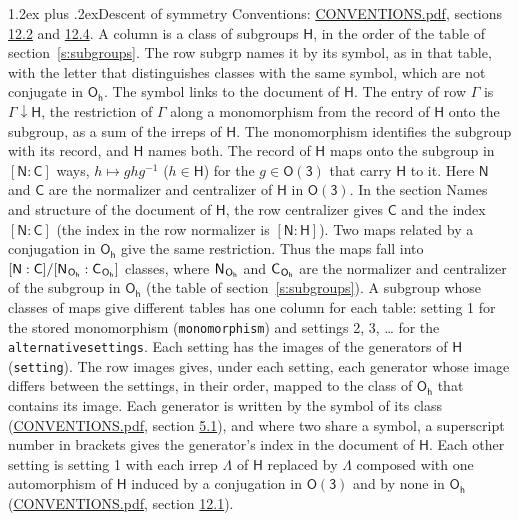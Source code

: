 \documentclass[10pt,a4paper]{article}
\makeatletter
\renewcommand\section{\@startsection{section}{1}{\z@}{-3ex plus -1ex minus -.2ex}%
  {1.2ex plus .2ex}{\normalfont\large\sffamily\bfseries\color{parttitle}}}
\numberwithin{equation}{section}
\newcommand{\grp}[1]{\mathsf{#1}}
\newcommand{\grpindex}[2]{[#1 : #2]}
\newcommand{\restr}[2]{#1\!\downarrow#2}
\newcommand{\hairsp}{\mkern1mu}
\makeatother
\begin{document}
\section{Descent of symmetry}\label{s:subduction}
Conventions: \href{../../CONVENTIONS.pdf}{CONVENTIONS.pdf}, sections \href{../../CONVENTIONS.pdf\#conv.12.2}{12.2} and \href{../../CONVENTIONS.pdf\#conv.12.4}{12.4}.
A column is a class of subgroups $\grp{H}$, in the order of the table of section~\ref{s:subgroups}. The row subgrp names it by its symbol, as in that table, with the letter that distinguishes classes with the same symbol, which are not conjugate in $\grp{O_{h}}$. The symbol links to the document of $\grp{H}$. The entry of row $\Gamma$ is $\restr{\Gamma}{\grp{H}}$, the restriction of $\Gamma$ along a monomorphism from the record of $\grp{H}$ onto the subgroup, as a sum of the irreps of $\grp{H}$. The monomorphism identifies the subgroup with its record, and $\grp{H}$ names both. \label{n:group.normalizer.o3}\label{n:group.centralizer.o3}The record of $\grp{H}$ maps onto the subgroup in $\grpindex{\grp{N}}{\grp{C}}$ ways, $h \mapsto g h g^{-1}$ ($h \in \grp{H}$) for the $g \in \grp{O(3)}$ that carry $\grp{H}$ to it. Here $\grp{N}$ and $\grp{C}$ are the normalizer and centralizer of $\grp{H}$ in \href{O3.pdf}{$\grp{O(3)}$}. In the section Names and structure of the document of $\grp{H}$, the row centralizer gives $\grp{C}$ and the index $\grpindex{\grp{N}}{\grp{C}}$ (the index in the row normalizer is $\grpindex{\grp{N}}{\grp{H}}$). Two maps related by a conjugation in $\grp{O_{h}}$ give the same restriction. Thus the maps fall into $\grpindex{\grp{N}}{\grp{C}}/\grpindex{\grp{N}_{\hairsp \grp{O_{h}}}}{\grp{C}_{\hairsp \grp{O_{h}}}}$ classes, where $\grp{N}_{\hairsp \grp{O_{h}}}$ and $\grp{C}_{\hairsp \grp{O_{h}}}$ are the normalizer and centralizer of the subgroup in $\grp{O_{h}}$ (the table of section~\ref{s:subgroups}). \label{n:head.setting}A subgroup whose classes of maps give different tables has one column for each table: setting 1 for the stored monomorphism (\texttt{monomorphism}) and settings 2, 3, \dots{} for the \texttt{alternativesettings}. Each setting has the images of the generators of $\grp{H}$ (\texttt{setting}). \label{n:head.images}The row images gives, under each setting, each generator whose image differs between the settings, in their order, mapped to the class of $\grp{O_{h}}$ that contains its image. \label{n:element.generator.index}Each generator is written by the symbol of its class (\href{../../CONVENTIONS.pdf}{CONVENTIONS.pdf}, section \href{../../CONVENTIONS.pdf\#conv.5.1}{5.1}), and where two share a symbol, a superscript number in brackets gives the generator's index in the document of $\grp{H}$. \label{n:irrep.Delta}Each other setting is setting 1 with each irrep $\Lambda$ of $\grp{H}$ replaced by $\Lambda$ composed with one automorphism of $\grp{H}$ induced by a conjugation in \href{O3.pdf}{$\grp{O(3)}$} and by none in $\grp{O_{h}}$ (\href{../../CONVENTIONS.pdf}{CONVENTIONS.pdf}, section \href{../../CONVENTIONS.pdf\#conv.12.1}{12.1}).
\end{document}

